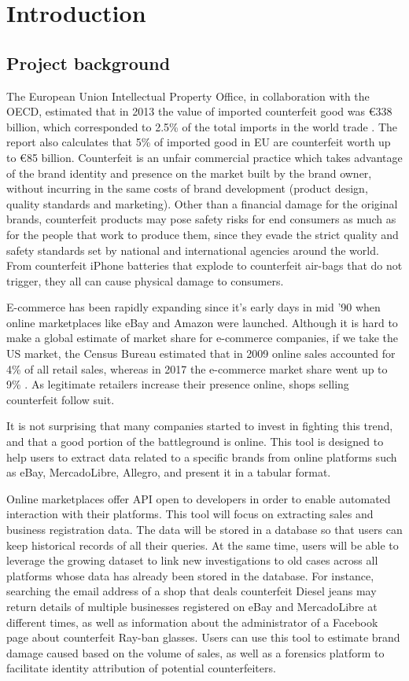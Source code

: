 \chapter{Introduction}

\section{Project background}
The European Union Intellectual Property Office, in collaboration with the
OECD, estimated that in 2013 the value of imported counterfeit good was
\euro338 billion, which corresponded to 2.5\% of the total imports in the world
trade \cite{OE16}. The report also calculates that 5\% of imported good in EU
are counterfeit worth up to \euro85 billion. Counterfeit is an unfair commercial
practice which takes advantage of the brand identity and presence on the market built by the brand
owner, without incurring in the same costs of brand development (product design,
quality standards and marketing). Other than a financial damage for the original
brands, counterfeit products may pose safety risks for end consumers as much as
for the people that work to produce them, since they evade the strict quality
and safety standards set by national and international agencies around the
world. From counterfeit iPhone batteries that explode to counterfeit air-bags
that do not trigger, they all can cause physical damage to consumers.

E-commerce has been rapidly expanding since it's early days in mid '90 when
online marketplaces like eBay and Amazon were launched. Although it is hard to
make a global estimate of market share for e-commerce companies, if we take the
US market, the Census Bureau estimated that in 2009 online sales accounted for
4\% of all retail sales, whereas in 2017 the e-commerce market share went up to
9\% \cite{USDC18}. As legitimate retailers increase their presence online,
shops selling counterfeit follow suit.

It is not surprising that many companies started to invest in fighting this
trend, and that a good portion of the battleground is online. This tool is
designed to help users to extract data related to a specific brands from online
platforms such as eBay, MercadoLibre, Allegro, and present it in a tabular
format.

Online marketplaces offer API open to developers in order to enable automated
interaction with their platforms. This tool will focus on extracting sales and
business registration data. The data will be stored in a database so that users
can keep historical records of all their queries. At the same time, users will
be able to leverage the growing dataset to link new investigations to old cases
across all platforms whose data has already been stored in the database. For
instance, searching the email address of a shop that deals counterfeit Diesel
jeans may return details of multiple businesses registered on eBay and
MercadoLibre at different times, as well as information about the administrator
of a Facebook page about counterfeit Ray-ban glasses. Users can use this tool to
estimate brand damage caused based on the volume of sales, as well as a
forensics platform to facilitate identity attribution of potential
counterfeiters.

